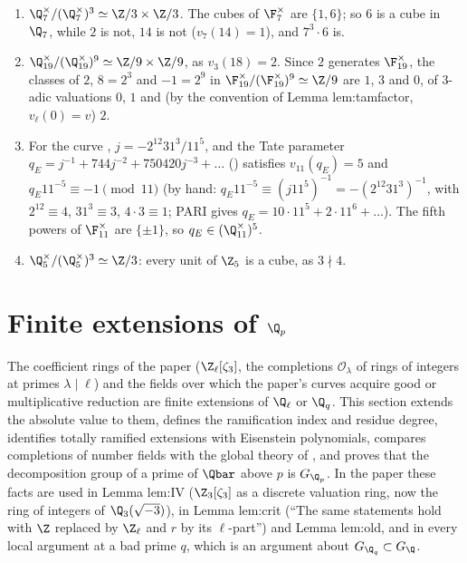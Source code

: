\begin{example}\label{ex:local:powers-examples}
\begin{enumerate}[label=(\alph*)]
\item $\Q_7^\times/(\Q_7^\times)^3\simeq\Z/3\times\Z/3$. The cubes of $\F_7^\times$ are $\{1,6\}$; so $6$ is a cube in $\Q_7$, while $2$ is not, $14$ is not
($v_7(14)=1$), and $7^3\cdot6$ is.
\item $\Q_{19}^\times/(\Q_{19}^\times)^9\simeq\Z/9\times\Z/9$, as $v_3(18)=2$. Since $2$ generates $\F_{19}^\times$, the classes of $2$, $8=2^3$ and
$-1=2^9$ in $\F_{19}^\times/(\F_{19}^\times)^9\simeq\Z/9$ are $1$, $3$ and $0$, of $3$-adic valuations $0$, $1$ and (by the convention of Lemma
lem:tamfactor, $v_\ell(0)=v$) $2$.
\item For the curve , $j=-2^{12}31^3/11^5$, and the Tate parameter $q_E=j^{-1}+744j^{-2}+750420j^{-3}+\dots$ ()
satisfies $v_{11}(q_E)=5$ and $q_E11^{-5}\equiv-1\pmod{11}$ (by hand: $q_E11^{-5}\equiv(j11^5)^{-1}=-(2^{12}31^3)^{-1}$, with $2^{12}\equiv4$, $31^3\equiv3$, $4\cdot3\equiv1$; PARI gives
$q_E=10\cdot11^5+2\cdot11^6+\dots$). The fifth powers of $\F_{11}^\times$ are $\{\pm1\}$, so $q_E\in(\Q_{11}^\times)^5$.
\item $\Q_5^\times/(\Q_5^\times)^3\simeq\Z/3$: every unit of $\Z_5$ is a cube, as $3\nmid4$.
\end{enumerate}
\end{example}

\section{Finite extensions of \texorpdfstring{$\Q_p$}{Qp}}\label{sec:local:ext}

The coefficient rings of the paper ($\Z_\ell[\zeta_3]$, the completions $\mathcal O_\lambda$ of rings of integers at primes $\lambda\mid\ell$) and
the fields over which the paper's curves acquire good or multiplicative reduction are finite extensions of $\Q_\ell$ or $\Q_q$. This section
extends the absolute value to them, defines the ramification index and residue degree, identifies totally ramified extensions with
Eisenstein polynomials, compares completions of number fields with the global theory of , and proves that the
decomposition group of a prime of $\Qbar$ above $p$ is $G_{\Q_p}$. In the paper these facts are used in Lemma lem:IV ($\Z_3[\zeta_3]$ as a
discrete valuation ring, now the ring of integers of $\Q_3(\sqrt{-3})$), in Lemma lem:crit (``The same statements hold with
$\Z$ replaced by $\Z_\ell$ and $r$ by its $\ell$-part'') and Lemma lem:old, and in every local argument at a bad prime $q$, which is an argument about $G_{\Q_q}\subset G_\Q$.

